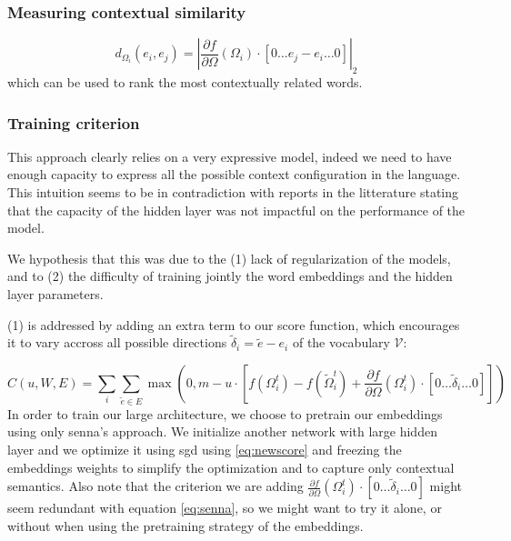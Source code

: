 \documentclass[11pt]{article} %
\begin{document}
\subsubsection{Measuring contextual similarity}
\begin{equation}
d_{\Omega_i}(e_i, e_j) = \left|  \frac{\partial f }{\partial  \Omega} \left(\Omega_i\right) \cdot \left[ 0\ldots e_j-e_i \ldots 0\right] \right|_2
\end{equation}
which can be used to rank the most contextually related words.

\subsubsection{Training criterion}
This approach clearly relies on a very expressive model, indeed we need to have enough capacity to express all the possible context configuration in the language. This intuition seems to be in contradiction with reports in the litterature stating that the capacity of the hidden layer was not impactful on the performance of the model. 

We hypothesis that this was due to the (1) lack of regularization of the models, and to (2) the difficulty of training jointly the word embeddings and the hidden layer parameters.

(1) is addressed by adding an extra term to our score function, which encourages it to vary accross all possible directions $\tilde{\delta}_{i} = \tilde{e} - e_i$ of the vocabulary $\mathcal{V}$:

\begin{equation}
\label{eq:newscore}
\displaystyle C(u,W,E) = \sum_i \sum_{\tilde e \in E} \max \left(0,m - u \cdot \left[ f\left(\Omega_i^t\right)   
- f\left(\tilde{\Omega}_i^t\right) + \frac{\partial f }{\partial  \Omega} \left(\Omega_i^t\right) \cdot \left[ 0\ldots\tilde{\delta}_{i} \ldots 0\right]  \right] \right) 
\end{equation}
In order to train our large architecture, we choose to pretrain our embeddings using only senna's approach. We initialize another network with large hidden layer and we optimize it using sgd using \ref{eq:newscore} and freezing the embeddings weights to simplify the optimization and to capture only contextual semantics. Also note that the criterion we are adding $\frac{\partial f }{\partial  \Omega} \left(\Omega_i^t\right) \cdot \left[ 0\ldots\tilde{\delta}_{i} \ldots 0\right] $ might seem redundant with equation \ref{eq:senna}, so we might want to try it alone, or without when using the pretraining strategy of the embeddings.
\end{document}
